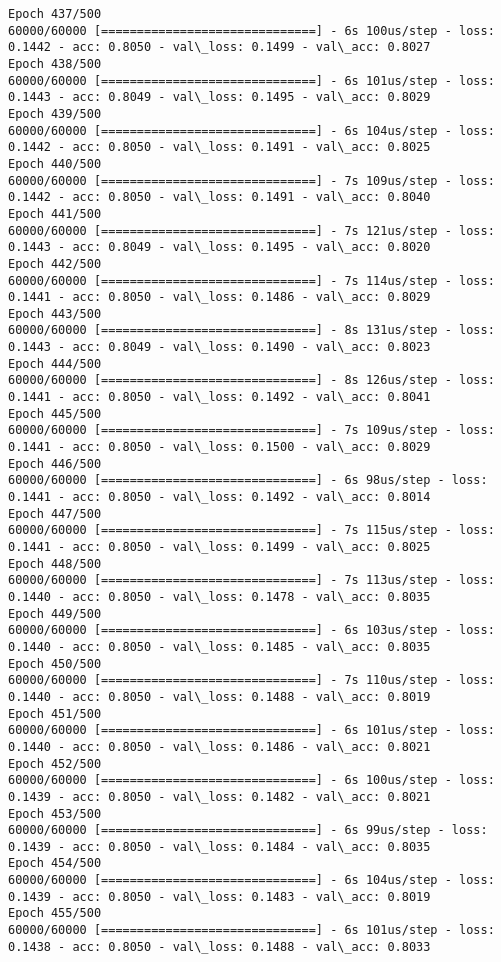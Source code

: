 \documentclass[11pt]{article}
\begin{document}
\begin{Verbatim}[commandchars=\\\{\}]
Epoch 437/500
60000/60000 [==============================] - 6s 100us/step - loss: 0.1442 - acc: 0.8050 - val\_loss: 0.1499 - val\_acc: 0.8027
Epoch 438/500
60000/60000 [==============================] - 6s 101us/step - loss: 0.1443 - acc: 0.8049 - val\_loss: 0.1495 - val\_acc: 0.8029
Epoch 439/500
60000/60000 [==============================] - 6s 104us/step - loss: 0.1442 - acc: 0.8050 - val\_loss: 0.1491 - val\_acc: 0.8025
Epoch 440/500
60000/60000 [==============================] - 7s 109us/step - loss: 0.1442 - acc: 0.8050 - val\_loss: 0.1491 - val\_acc: 0.8040
Epoch 441/500
60000/60000 [==============================] - 7s 121us/step - loss: 0.1443 - acc: 0.8049 - val\_loss: 0.1495 - val\_acc: 0.8020
Epoch 442/500
60000/60000 [==============================] - 7s 114us/step - loss: 0.1441 - acc: 0.8050 - val\_loss: 0.1486 - val\_acc: 0.8029
Epoch 443/500
60000/60000 [==============================] - 8s 131us/step - loss: 0.1443 - acc: 0.8049 - val\_loss: 0.1490 - val\_acc: 0.8023
Epoch 444/500
60000/60000 [==============================] - 8s 126us/step - loss: 0.1441 - acc: 0.8050 - val\_loss: 0.1492 - val\_acc: 0.8041
Epoch 445/500
60000/60000 [==============================] - 7s 109us/step - loss: 0.1441 - acc: 0.8050 - val\_loss: 0.1500 - val\_acc: 0.8029
Epoch 446/500
60000/60000 [==============================] - 6s 98us/step - loss: 0.1441 - acc: 0.8050 - val\_loss: 0.1492 - val\_acc: 0.8014
Epoch 447/500
60000/60000 [==============================] - 7s 115us/step - loss: 0.1441 - acc: 0.8050 - val\_loss: 0.1499 - val\_acc: 0.8025
Epoch 448/500
60000/60000 [==============================] - 7s 113us/step - loss: 0.1440 - acc: 0.8050 - val\_loss: 0.1478 - val\_acc: 0.8035
Epoch 449/500
60000/60000 [==============================] - 6s 103us/step - loss: 0.1440 - acc: 0.8050 - val\_loss: 0.1485 - val\_acc: 0.8035
Epoch 450/500
60000/60000 [==============================] - 7s 110us/step - loss: 0.1440 - acc: 0.8050 - val\_loss: 0.1488 - val\_acc: 0.8019
Epoch 451/500
60000/60000 [==============================] - 6s 101us/step - loss: 0.1440 - acc: 0.8050 - val\_loss: 0.1486 - val\_acc: 0.8021
Epoch 452/500
60000/60000 [==============================] - 6s 100us/step - loss: 0.1439 - acc: 0.8050 - val\_loss: 0.1482 - val\_acc: 0.8021
Epoch 453/500
60000/60000 [==============================] - 6s 99us/step - loss: 0.1439 - acc: 0.8050 - val\_loss: 0.1484 - val\_acc: 0.8035
Epoch 454/500
60000/60000 [==============================] - 6s 104us/step - loss: 0.1439 - acc: 0.8050 - val\_loss: 0.1483 - val\_acc: 0.8019
Epoch 455/500
60000/60000 [==============================] - 6s 101us/step - loss: 0.1438 - acc: 0.8050 - val\_loss: 0.1488 - val\_acc: 0.8033

\end{Verbatim}
\end{document}
